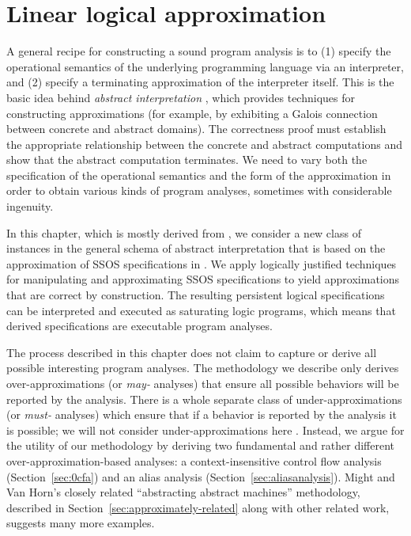 \chapter{Linear logical approximation}
\label{chapter-approx}

A general recipe for constructing a sound program analysis is to (1)
specify the operational semantics of the underlying programming
language via an interpreter, and (2) specify a terminating
approximation of the interpreter itself. This is the basic idea behind
{\it abstract interpretation} \cite{cousot77abstract}, which provides
techniques for constructing approximations (for example, by exhibiting
a Galois connection between concrete and abstract domains). The
correctness proof must establish the appropriate relationship between
the concrete and abstract computations and show that the abstract
computation terminates. We need to vary both the specification of the
operational semantics and the form of the approximation in order to
obtain various kinds of program analyses, sometimes with considerable
ingenuity.

In this chapter, which is mostly derived from \cite{simmons11logical},
we consider a new class of instances in the general schema of abstract
interpretation that is based on the approximation of SSOS
specifications in \sls. We apply logically justified techniques for
manipulating and approximating SSOS specifications to yield
approximations that are correct by construction. The resulting
persistent logical specifications can be interpreted and executed as
saturating logic programs, which means that derived specifications
are executable program analyses.

The process described in this chapter does not claim to capture or 
derive all possible interesting program analyses. 
The methodology we describe only derives over-approximations
(or {\it may-} analyses) that ensure all possible behaviors will be
reported by the analysis. There is a whole separate class of 
under-approximations (or {\it must-} analyses) which ensure that if a
behavior is reported by the analysis it is possible; %
we will not consider under-approximations here
\cite{godefroid10compositional}. Instead, we argue for the utility of
our methodology by deriving two fundamental and rather different
over-approximation-based analyses: a context-insensitive control flow
analysis (Section~\ref{sec:0cfa}) and an alias analysis
(Section~\ref{sec:aliasanalysis}). Might and Van Horn's closely
related ``abstracting abstract machines'' methodology, described in
Section~\ref{sec:approximately-related} along with other related work,
suggests many more examples.

